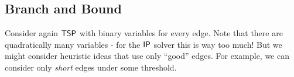 \subsection{Branch and Bound}
Consider again $\mathsf{TSP}$ with binary variables for every edge.
Note that there are quadratically many variables - for the $\mathsf{IP}$ solver this is way too much!
But we might consider heuristic ideas that use only \enquote{good} edges.
For example, we can consider only \emph{short} edges under some threshold.